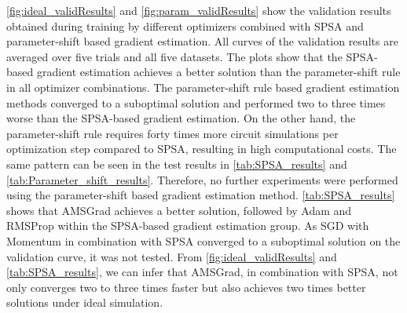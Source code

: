 \cref{fig:ideal_validResults} and \cref{fig:param_validResults} show the validation results obtained during training by different optimizers combined with SPSA and parameter-shift based gradient estimation. All curves of the validation results are averaged over five trials and all five datasets. The plots show that the SPSA-based gradient estimation achieves a better solution than the parameter-shift rule in all optimizer combinations. The parameter-shift rule based gradient estimation methods converged to a suboptimal solution and performed two to three times worse than the SPSA-based gradient estimation. On the other hand, the parameter-shift rule requires forty times more circuit simulations per optimization step compared to SPSA, resulting in high computational costs. The same pattern can be seen in the test results in \cref{tab:SPSA_results} and \cref{tab:Parameter_shift_results}. Therefore, no further experiments were performed using the parameter-shift based gradient estimation method. \cref{tab:SPSA_results} shows that AMSGrad achieves a better solution, followed by Adam and RMSProp within the SPSA-based gradient estimation group. As SGD with Momentum in combination with SPSA converged to a suboptimal solution on the validation curve, it was not tested.
From \cref{fig:ideal_validResults} and \cref{tab:SPSA_results}, we can infer that AMSGrad, in combination with SPSA, not only converges two to three times faster but also achieves two times better solutions under ideal simulation.



